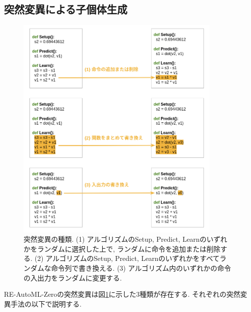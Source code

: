 \documentclass[11pt,oneside,openany,report]{jsbook}
\begin{document}
\subsection{突然変異による子個体生成}\label{subsec:problem:existing_method:mutation}

\begin{figure}
  \centering
  \includegraphics[width=10cm]{problem/existing_method/mutation.png}
  \caption{突然変異の種類\cite{automl_zero}. (1) アルゴリズムのSetup, Predict, Learnのいずれかをランダムに選択した上で, ランダムに命令を追加または削除する. (2) アルゴリズムのSetup, Predict, Learnのいずれかをすべてランダムな命令列で書き換える. (3) アルゴリズム内のいずれかの命令の入出力をランダムに変更する. }
  \label{fig:re_automl_zero:mutation}
\end{figure}

RE-AutoML-Zeroの突然変異は図\ref{fig:re_automl_zero:mutation}に示した3種類が存在する. それぞれの突然変異手法の以下で説明する.
\end{document}
